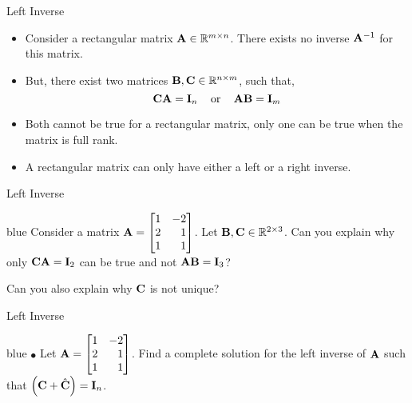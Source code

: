\documentclass[aspectratio=169]{beamer}
\let\olditem\item
\renewcommand{\item}{\setlength{\itemsep}{\fill}\olditem}
\def\mf{\ensuremath\mathbf}
\def\mb{\ensuremath\mathbb}
\def\lp{\ensuremath\left(}
\def\rp{\ensuremath\right)}
\begin{document}


\begin{frame}[t]{Left Inverse}
\begin{itemize}
    \item Consider a rectangular matrix $\mf{A} \in \mb{R}^{m \times n}$. There exists no inverse $\mf{A}^{-1}$ for this matrix.

    \item But, there exist two matrices $\mf{B}, \mf{C} \in \mb{R}^{n \times m}$, such that,
    \[ \mf{CA} = \mf{I}_n \,\,\,\,\, \text{ or } \,\,\,\,\, \mf{AB} = \mf{I}_m \]

    \item Both cannot be true for a rectangular matrix, only one can be true when the matrix is full rank.

    \item A rectangular matrix can only have either a left or a right inverse.

\end{itemize}
\end{frame}

\begin{frame}[t]{Left Inverse}
\begin{color}{blue}
    Consider a matrix $\mf{A} = \begin{bmatrix*}[r]1 & -2\\2 & 1\\1 & 1\end{bmatrix*}$. Let $\mf{B}, \mf{C}  \in \mb{R}^{2 \times 3}$. Can you explain why only $\mf{CA} = \mf{I}_2$ can be true and not $\mf{AB} = \mf{I}_3$?\\ \vspace{2cm}


    Can you also explain why $\mf{C}$ is not unique?
\end{color}
\end{frame}

\begin{frame}[t]{Left Inverse}
\begin{color}{blue}
    $\bullet$ Let $\mf{A} = \begin{bmatrix*}[r]1 & -2\\2 & 1\\1 & 1\end{bmatrix*}$. Find a complete solution for the left inverse of $\mf{A}$ such that $\lp\mf{C} + \hat{\mf{C}}\rp = \mf{I}_n$.\\
    \vspace{2cm}
\end{color}
\end{frame}
\end{document}
